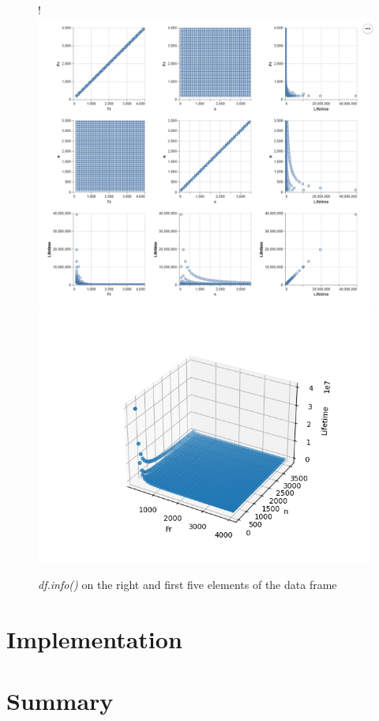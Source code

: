 \documentclass[a4paper, 12pt, oneside]{scrbook}
\begin{document}
			\begin{figure} [H]
				\centering
				\resizebox{\linewidth} {!} {
					\includegraphics{res/firstEDA/crosschart.png}
					\includegraphics{res/firstEDA/3dscatter.png}
				}
				\caption{\textit{df.info()} on the right and first five elements of the data frame}
				\label{fig:firstEDA_crosstable}
			\end{figure}
	
	\chapter{Implementation}
	
	
	\chapter{Summary} %
	
	\frontmatter
	\printbibliography
\end{document}
